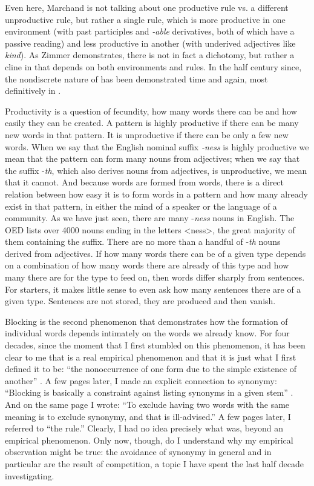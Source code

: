 \documentclass[output=paper]{langsci/langscibook}
\begin{document}
Even here, Marchand is not talking about one productive rule vs. a
different unproductive rule, but rather a single rule, which is more
productive in one environment (with past participles and \emph{-able}
derivatives, both of which have a passive reading) and less productive
in another (with underived adjectives like \emph{kind}). As Zimmer
demonstrates, there is not in fact a dichotomy, but rather a cline in
 that depends on both environments and rules. In the half
century since, the nondiscrete nature of  has been
demonstrated time and again, most definitively in 
\citet{Bauer01}.

Productivity is a question of fecundity, how many words there can be and
how easily they can be created. A pattern is highly productive if there
can be many new words in that pattern. It is unproductive if there can
be only a few new words. When we say that the English nominal suffix
\emph{-ness} is highly productive we mean that the pattern can form many
nouns from adjectives; when we say that the suffix -\emph{th}, which
also derives nouns from adjectives, is unproductive, we mean that it
cannot. And because words are formed from words, there is a direct
relation between how easy it is to form words in a pattern and how many
already exist in that pattern, in either  the mind of a speaker or the
language of a community. As we have just seen, there are many
-\emph{ness} nouns in English. The OED lists over 4000 nouns ending in
the letters \textless{}ness\textgreater{}, the great majority of them
containing the suffix. There are no more than a handful of -\emph{th}
nouns derived from adjectives. If how many words there can be of a given
type depends on a combination of how many words there are already of
this type and how many there are for the type to feed on, then words
differ sharply from sentences. For starters, it makes little sense to
even ask how many sentences there are of a given type. Sentences are not
stored, they are produced and then vanish.

Blocking is the second phenomenon that demonstrates how the formation of
individual words depends intimately on the words we already know. For
four decades, since the moment that I first stumbled on this phenomenon,
it has been clear to me that  is a real empirical phenomenon and
that it is just what I first defined it to be: ``the nonoccurrence of
one form due to the simple existence of another'' \citep[43]{Aronoff1976}. A few pages later, I made an explicit connection to synonymy:
``Blocking is basically a constraint against listing synonyms in a given
stem'' \citep[55]{Aronoff1976}. And on the same page I wrote: ``To exclude having
two words with the same meaning is to exclude synonymy, and that is
ill-advised.'' A few pages later, I referred to ``the  rule.''
Clearly, I had no idea precisely what  was, beyond an empirical
phenomenon. Only now, though, do I understand why my empirical
observation might be true: the avoidance of synonymy in general and
 in particular are the result of competition, a topic I have
spent the last half decade investigating.
\end{document}
